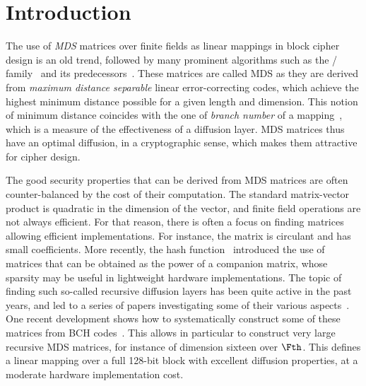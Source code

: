 \section{Introduction}

The use of \emph{MDS} matrices over finite fields as linear mappings in block cipher design is an old trend, followed by many prominent algorithms such as the \AES/\rijndael{} family~\cite{aes} and its predecessors~\cite{shark,square}.
These matrices are called MDS as they are derived from \emph{maximum distance separable} linear error-correcting codes, which achieve the highest minimum distance possible
for a given length and dimension. This notion of minimum distance coincides with the one of \emph{branch number} of a mapping~\cite{phddaemen}, which is a measure of the effectiveness
of a diffusion layer.
MDS matrices thus have an optimal diffusion, in a cryptographic sense, which makes them attractive for cipher design.

The good security properties that can be derived from MDS matrices are often counter-balanced by the cost of their computation. The standard matrix-vector product is
quadratic in the dimension of the vector, and finite field operations are not always efficient.
For that reason, there is often a focus on finding matrices allowing efficient implementations. For instance, the \AES{} matrix is circulant and has small coefficients.
More recently, the \photon{} hash function~\cite{photon} introduced the use of matrices that can be obtained as the power of a companion matrix, whose sparsity may be useful in
lightweight hardware implementations. The topic of finding such so-called recursive diffusion layers has been quite active in the past years, and led to a series
of papers investigating some of their various aspects~\cite{recursive1,recursive2,recursive3}. One recent development shows how to systematically construct some of these matrices
from BCH codes~\cite{recursive4}. This allows in particular to construct very large recursive MDS matrices, for instance of dimension sixteen over $\Fth$. This defines a linear mapping over
a full 128-bit block with excellent diffusion properties, at a moderate hardware implementation cost.

